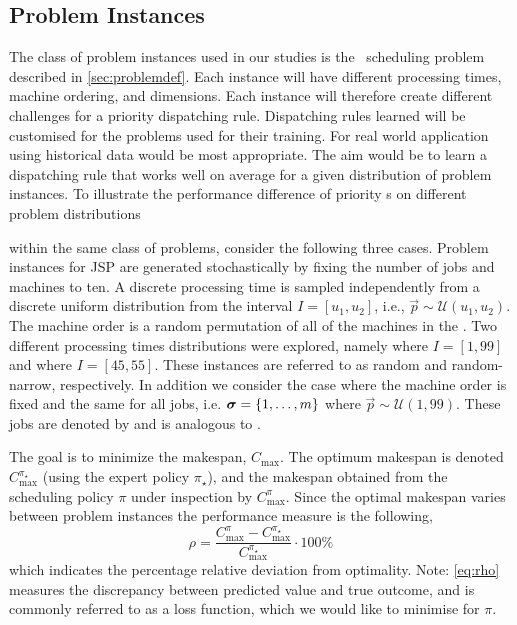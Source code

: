 \documentclass[smallextended]{svjour3}
\begin{document}
	\subsection{Problem Instances}\label{sec:data:sim}
	
	The class of problem instances used in our studies is the \jsp\ scheduling 
	problem described in \cref{sec:problemdef}. Each instance will have 
	different processing times, machine ordering, and dimensions. Each instance will 
	therefore create different challenges for a priority dispatching rule. 
	Dispatching rules learned will be customised for the problems used for their 
	training. For real world application using historical data would be most 
	appropriate. The aim would be to learn a dispatching rule that works well on 
	average for a given distribution of problem instances. To illustrate the performance 
	difference of priority \dr s on different problem distributions 
	
	within the same class of problems, consider the following three cases.
	Problem instances for JSP are generated stochastically by fixing the number of 
	jobs and machines to ten. A discrete processing time is sampled independently 
	from a discrete uniform distribution from the interval $I=[u_1,u_2]$, i.e., 
	$\vec{p}\sim \mathcal{U}(u_1,u_2)$. 
	The machine order is a random permutation of all of the machines in the 
	\jsp. Two different processing times distributions were explored, namely 
	 where $I=[1,99]$ and  where $I=[45,55]$. These 
	instances are referred to as random and random-narrow, respectively. In 
	addition we consider the case where the machine order is fixed and the same for 
	all jobs, i.e. $\bm \sigma=\{1,\ldots,m\}$ where 
	$\vec{p}\sim\mathcal{U}(1,99)$. 
	These jobs are denoted by  and is analogous to .
	
	The goal is to minimize the makespan, $C_{\max}$. The optimum 
	makespan is denoted $C_{\max}^{\pi_\star}$ (using the expert policy 
	$\pi_\star$), and the makespan obtained from the 
	scheduling policy $\pi$ under inspection by $C_{\max}^{\pi}$. Since the optimal 
	makespan varies between problem instances the performance measure is the 
	following,
	\begin{equation}\label{eq:rho}
	\rho=\frac{C_{\max}^{\pi}-C_{\max}^{\pi_\star}}{C_{\max}^{\pi_\star}}\cdot
	100\%
	\end{equation}
	which indicates the percentage relative deviation from optimality. 
	Note: \cref{eq:rho} measures the discrepancy between predicted value and true 
	outcome, and is commonly referred to as a loss function, which we would like to 
	minimise for $\pi$.
	
\end{document}

